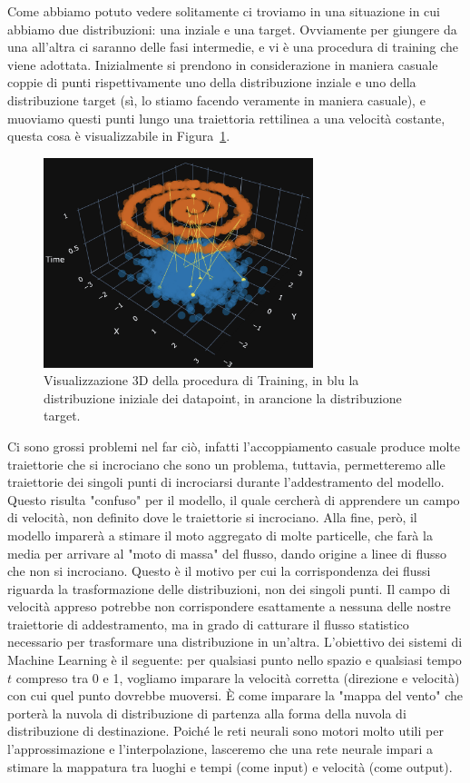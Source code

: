 Come abbiamo potuto vedere solitamente ci troviamo in una situazione in cui abbiamo due distribuzioni: una inziale e una target. Ovviamente per giungere da una all'altra ci saranno delle fasi intermedie, e vi è una procedura di training che viene adottata. Inizialmente si prendono in considerazione in maniera casuale coppie di punti rispettivamente uno della distribuzione inziale e uno della distribuzione target (sì, lo stiamo facendo veramente in maniera casuale), e muoviamo questi punti lungo una traiettoria rettilinea a una velocità costante, questa cosa è visualizzabile in Figura~\ref{fig:FMTrain}.
\begin{figure}
    \centering
    \includegraphics[width=0.7\textwidth]{figure/FMTrain.png}
    \caption{Visualizzazione 3D della procedura di Training, in blu la distribuzione iniziale dei datapoint, in arancione la distribuzione target.}
    \label{fig:FMTrain}
\end{figure}
Ci sono grossi problemi nel far ciò, infatti l'accoppiamento casuale produce molte traiettorie che si incrociano che sono un problema, tuttavia, permetteremo alle traiettorie dei singoli punti di incrociarsi durante l'addestramento del modello. Questo risulta "confuso" per il modello, il quale cercherà di apprendere un campo di velocità, non definito dove le traiettorie si incrociano. Alla fine, però, il modello imparerà a stimare il moto aggregato di molte particelle, che farà la media per arrivare al "moto di massa" del flusso, dando origine a linee di flusso che non si incrociano. Questo è il motivo per cui la corrispondenza dei flussi riguarda la trasformazione delle distribuzioni, non dei singoli punti. Il campo di velocità appreso potrebbe non corrispondere esattamente a nessuna delle nostre traiettorie di addestramento, ma in grado di catturare il flusso statistico necessario per trasformare una distribuzione in un'altra. L'obiettivo dei sistemi di Machine Learning è il seguente: per qualsiasi punto nello spazio e qualsiasi tempo $t$ compreso tra 0 e 1, vogliamo imparare la velocità corretta (direzione e velocità) con cui quel punto dovrebbe muoversi. È come imparare la "mappa del vento" che porterà la nuvola di distribuzione di partenza alla forma della nuvola di distribuzione di destinazione. Poiché le reti neurali sono motori molto utili per l'approssimazione e l'interpolazione, lasceremo che una rete neurale impari a stimare la mappatura tra luoghi e tempi (come input) e velocità (come output).

